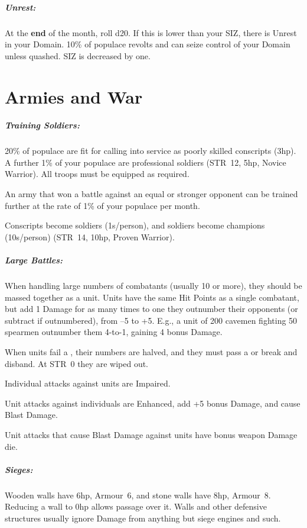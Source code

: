 \documentclass[itdr/core]{subfiles}
\begin{document}
\subparagraph{Unrest:} At the \textbf{end} of the month, roll d20. If this is lower than your SIZ, there is Unrest in your Domain. 10\% of populace revolts and can seize control of your Domain unless quashed. SIZ is decreased by one.

\section{Armies and War}


\subparagraph{Training Soldiers:} 20\% of populace are fit for calling into service as poorly skilled conscripts (3hp). A further 1\% of your populace are professional soldiers (STR~12, 5hp, Novice Warrior). All troops must be equipped as required.

An army that won a battle against an equal or stronger opponent can be trained further at the rate of 1\% of your populace per month.

Conscripts become soldiers (1s/person), and \mbox{soldiers} become champions (10s/person) (STR~14, 10hp, Proven Warrior).

\subparagraph{Large Battles:} When handling large numbers of combatants (usually 10 or more), they should be massed together as a unit. Units have the same Hit Points as a single combatant, but add 1 Damage for as many times to one they outnumber their opponents (or subtract if outnumbered), from --5 to +5. E.g., a unit of 200 cavemen fighting 50 spearmen outnumber them \mbox{4-to-1}, gaining 4 bonus Damage.

When units fail a \textbf{}, their numbers are halved, and they must pass a  or break and disband. At STR~0 they are wiped out.\tight

Individual attacks against units are Impaired.

Unit attacks against individuals are Enhanced, add +5 bonus Damage, and cause Blast Damage.

Unit attacks that cause Blast Damage against units have bonus weapon Damage die.

\subparagraph{Sieges:} Wooden walls have 6hp, Armour~6, and stone walls have 8hp, Armour~8. Reducing a wall to 0hp allows passage over it. Walls and other defensive structures usually ignore Damage from anything but siege engines and such.
\end{document}
